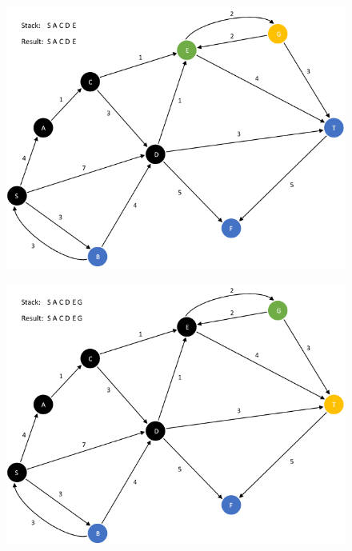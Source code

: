 \documentclass{article}
\begin{document}
\begin{enumerate}[leftmargin=\labelsep]
\begin{figure}[H]
\centering
\includegraphics[scale=0.6]{images/Q5/a/05.png}
\end{figure}

\begin{figure}[H]
\centering
\includegraphics[scale=0.6]{images/Q5/a/06.png}
\end{figure}


\end{enumerate}
\end{document}
